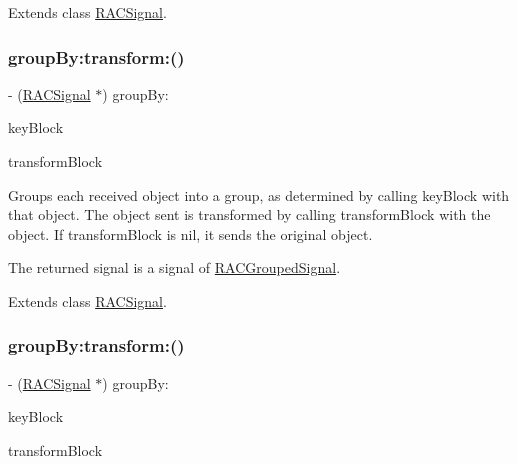 Extends class \mbox{\hyperlink{interface_r_a_c_signal_a72e5f2fd80960ee5422e08ceef0f4e2c}{R\+A\+C\+Signal}}.

\mbox{\label{category_r_a_c_signal_07_operations_08_ad04cf174e24905df96f211b60e31a3cd}} 
\subsubsection{\texorpdfstring{group\+By\+:transform\+:()}{groupBy:transform:()}\hspace{0.1cm}{\footnotesize\ttfamily [1/3]}}
{\footnotesize\ttfamily -\/ (\mbox{\hyperlink{interface_r_a_c_signal}{R\+A\+C\+Signal}} $\ast$) group\+By\+: \begin{DoxyParamCaption}\item[{(id$<$ N\+S\+Copying $>$($^\wedge$)(id object))}]{key\+Block }\item[{transform:(id($^\wedge$)(id object))}]{transform\+Block }\end{DoxyParamCaption}}

Groups each received object into a group, as determined by calling {\ttfamily key\+Block} with that object. The object sent is transformed by calling {\ttfamily transform\+Block} with the object. If {\ttfamily transform\+Block} is nil, it sends the original object.

The returned signal is a signal of \mbox{\hyperlink{interface_r_a_c_grouped_signal}{R\+A\+C\+Grouped\+Signal}}. 

Extends class \mbox{\hyperlink{interface_r_a_c_signal_ad04cf174e24905df96f211b60e31a3cd}{R\+A\+C\+Signal}}.

\mbox{\label{category_r_a_c_signal_07_operations_08_ad04cf174e24905df96f211b60e31a3cd}} 
\subsubsection{\texorpdfstring{group\+By\+:transform\+:()}{groupBy:transform:()}\hspace{0.1cm}{\footnotesize\ttfamily [2/3]}}
{\footnotesize\ttfamily -\/ (\mbox{\hyperlink{interface_r_a_c_signal}{R\+A\+C\+Signal}} $\ast$) group\+By\+: \begin{DoxyParamCaption}\item[{(id$<$N\+S\+Copying$>$($^\wedge$)(id object))}]{key\+Block }\item[{transform:(id($^\wedge$)(id object))}]{transform\+Block }\end{DoxyParamCaption}}

